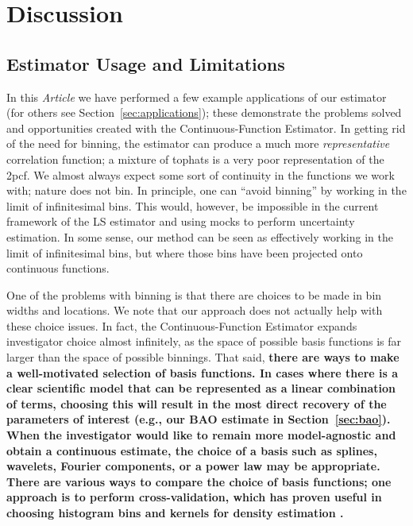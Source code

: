 \documentclass[modern]{aastex62}
\newcommand{\cf}{2pcf\xspace}
\newcommand{\est}{the Continuous-Function Estimator\xspace}
\newcommand{\documentname}{\textsl{Article}\xspace}
\newcommand{\LS}{LS\xspace}
\newcommand{\new}[1]{\textbf{#1}}
\begin{document}
\section{Discussion} \label{sec:discuss}

\subsection{Estimator Usage and Limitations}

In this \documentname we have performed a few example applications of our estimator (for others see Section~\ref{sec:applications}); these demonstrate the problems solved and opportunities created with \est.
In getting rid of the need for binning, the estimator can produce a much more \textit{representative} correlation function; a mixture of tophats is a very poor representation of the \cf. 
We almost always expect some sort of continuity in the functions we work with; nature does not bin.
In principle, one can ``avoid binning'' by working in the limit of infinitesimal bins.
This would, however, be impossible in the current framework of the \LS estimator and using mocks to perform uncertainty estimation.
In some sense, our method can be seen as effectively working in the limit of infinitesimal bins, but where those bins have been projected onto continuous functions.

One of the problems with binning is that there are choices to be made in bin widths and locations.
We note that our approach does not actually help with these choice issues.
In fact, \est expands investigator choice almost infinitely, as the space of possible basis functions is far larger than the space of possible binnings.
That said, \new{there are ways to make a well-motivated selection of basis functions.
In cases where there is a clear scientific model that can be represented as a linear combination of terms, choosing this will result in the most direct recovery of the parameters of interest (e.g., our BAO estimate in Section~\ref{sec:bao}).
When the investigator would like to remain more model-agnostic and obtain a continuous estimate, the choice of a basis such as splines, wavelets, Fourier components, or a power law may be appropriate.
There are various ways to compare the choice of basis functions; one approach is to perform cross-validation, which has proven useful in choosing histogram bins and kernels for density estimation \citep{Rudemo1982, Hogg2008}.}
\end{document}
